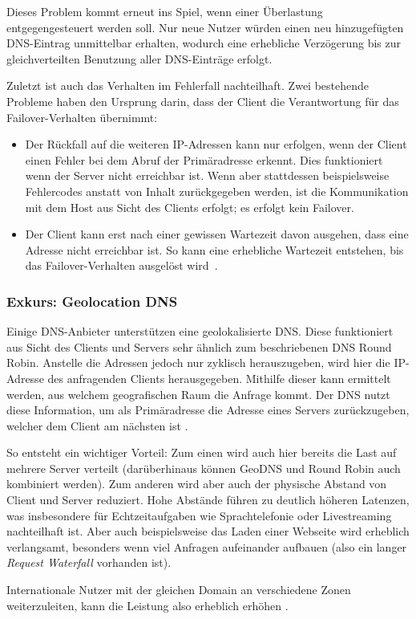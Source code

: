 Dieses Problem kommt erneut ins Spiel, wenn einer Überlastung entgegengesteuert werden soll.
Nur neue Nutzer würden einen neu hinzugefügten DNS-Eintrag unmittelbar erhalten, wodurch eine erhebliche Verzögerung bis zur gleichverteilten Benutzung aller DNS-Einträge erfolgt.

Zuletzt ist auch das Verhalten im Fehlerfall nachteilhaft.
Zwei bestehende Probleme haben den Ursprung darin, dass der Client die Verantwortung für das Failover-Verhalten übernimmt:
\begin{itemize}
	\item Der Rückfall auf die weiteren IP-Adressen kann nur erfolgen, wenn der Client einen Fehler bei dem Abruf der Primäradresse erkennt. Dies funktioniert wenn der Server nicht erreichbar ist. Wenn aber stattdessen beispielsweise Fehlercodes anstatt von Inhalt zurückgegeben werden, ist die Kommunikation mit dem Host aus Sicht des Clients erfolgt; es erfolgt kein Failover.
	\item Der Client kann erst nach einer gewissen Wartezeit davon ausgehen, dass eine Adresse nicht erreichbar ist. So kann eine erhebliche Wartezeit entstehen, bis das Failover-Verhalten ausgelöst wird~\cite{so-dns-slow}.%
\end{itemize}

\subsubsection{Exkurs: Geolocation DNS}
Einige DNS-Anbieter unterstützen eine geolokalisierte DNS. Diese funktioniert aus Sicht des Clients und Servers sehr ähnlich zum beschriebenen DNS Round Robin. Anstelle die Adressen jedoch nur zyklisch herauszugeben, wird hier die IP-Adresse des anfragenden Clients herausgegeben. Mithilfe dieser kann ermittelt werden, aus welchem geografischen Raum die Anfrage kommt. Der DNS nutzt diese Information, um als Primäradresse die Adresse eines Servers zurückzugeben, welcher dem Client am nächsten ist \cite{mic-geodns}. 

So entsteht ein wichtiger Vorteil: Zum einen wird auch hier bereits die Last auf mehrere Server verteilt (darüberhinaus können GeoDNS und Round Robin auch kombiniert werden). Zum anderen wird aber auch der physische Abstand von Client und Server reduziert. Hohe Abstände führen zu deutlich höheren Latenzen, was insbesondere für Echtzeitaufgaben wie Sprachtelefonie oder Livestreaming nachteilhaft ist. Aber auch beispielsweise das Laden einer Webseite wird erheblich verlangsamt, besonders wenn viel Anfragen aufeinander aufbauen (also ein langer \textit{Request Waterfall} vorhanden ist).

Internationale Nutzer mit der gleichen Domain an verschiedene Zonen weiterzuleiten, kann die Leistung also erheblich erhöhen \cite{mic-geodns}.






